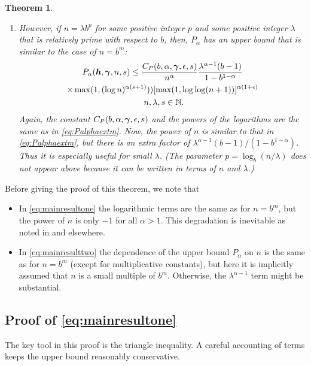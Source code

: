 \documentclass[authoryear]{elsarticle}
\newtheorem{theorem}{Theorem}
\begin{document}
\begin{theorem}
\begin{enumerate}
    \item However, if $n = \lambda b^p$ for some positive integer $p$ and some positive integer  $\lambda$ that is relatively prime with respect to $b$, then, %
    $P_\alpha$ has an upper bound that is similar to the case of $n=b^m$:
    \begin{multline} \label{eq:mainresulttwo}
         P_\alpha(\boldsymbol{h},\boldsymbol{\gamma},n,s)
         \le \frac{{C}_{P}(b,\alpha, \boldsymbol{\gamma},\epsilon,s)}{n^{\alpha}}  \frac {\lambda^{\alpha -1}(b-1)} {1 - b^{1- \alpha}}  \\
         \times \max(1, (\log n )^{\alpha(s+1)})) [\max(1,\log \log (
    n+1))]^{\alpha(1+\epsilon)} \\
 \ n, \lambda, s \in \mathbb{N}.
    \end{multline} 
    Again, the constant $C_{P}(b,\alpha,\boldsymbol{\gamma},\epsilon,s)$ and the powers of the logarithms are the same as in \eqref{eq:Palphaextm}. Now, the power of $n$ is similar to that in \eqref{eq:Palphaextm}, but there is an extra factor of $\lambda^{\alpha -1}(b-1)/(1 - b^{1-\alpha})$.  Thus it is especially useful for small $\lambda$. (The parameter $p = \log_b(n/\lambda)$ does not appear above because it can be written in terms of $n$ and $\lambda$.)

     \end{enumerate}
    
\end{theorem}

Before giving the proof of this theorem, we note that 

\begin{itemize}
    \item In \eqref{eq:mainresultone} the logarithmic terms are the same as for $n=b^m$, but the power of $n$ is only $-1$ for all $\alpha > 1$.  This degradation is inevitable as noted in \cite{HicEtal10a} and elsewhere.
    \item In \eqref{eq:mainresulttwo} the dependence of the upper bound $P_\alpha$ on $n$ is the same as for $n=b^m$ (except for multiplicative constants), but  here it is implicitly assumed that $n$ is a small multiple of $b^m$.  Otherwise, the $\lambda^{\alpha-1}$ term might be substantial.
\end{itemize}

\subsection{Proof of \eqref{eq:mainresultone}}
The key tool in this proof is the triangle inequality.  A careful accounting of terms keeps the upper bound reasonably conservative.
\end{document}
